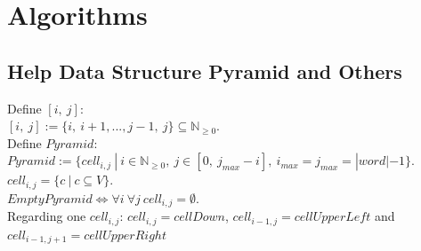 
\section{Algorithms}\label{algorithms}

\subsection{Help Data Structure Pyramid and Others}

\noindent Define $[i,\ j]$: \\
$[i,\ j] := \{i,\ i+1,..., j-1,\ j\} \subseteq \mathbb{N}_{\geq 0}$.\\

\noindent Define $Pyramid$:\\
$Pyramid :=\{ cell_{i,j}\ |\ i \in \mathbb{N}_{\geq 0},\  j \in [0,\ j_{max}-i],\ i_{max} = j_{max} = |word|-1\}$.\\
$cell_{i,j} = \{c\ |\ c \subseteq V\}$.\\
$EmptyPyramid \Leftrightarrow \forall i\ \forall j\ cell_{i,j}=\emptyset$.\\
Regarding one $cell_{i,j}$: $cell_{i,j} = cellDown$, $cell_{i-1,j} = cellUpperLeft$ and $cell_{i-1,j+1} = cellUpperRight$  \\


